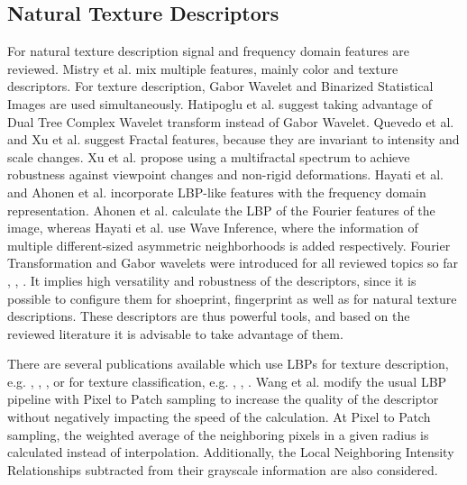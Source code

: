 \documentclass[draft,final]{vutinfth} %
\begin{document}
\subsection{Natural Texture Descriptors}
\par
For natural texture description signal and frequency domain features are reviewed.
Mistry et al. \cite{mistry2018content} mix multiple features, mainly color and texture descriptors.
For texture description, Gabor Wavelet and Binarized Statistical Images  \cite{kannala2012bsif} are used simultaneously.
Hatipoglu et al. \cite{hatipoglu2000image} suggest taking advantage of Dual Tree Complex Wavelet transform instead of Gabor Wavelet.
Quevedo et al. \cite{quevedo2002description} and Xu et al. \cite{xu2009viewpoint} suggest Fractal features, because they are invariant to intensity and scale changes.
Xu et al. \cite{xu2009viewpoint} propose using a multifractal spectrum to achieve robustness against viewpoint changes and non-rigid deformations.
Hayati et al. \cite{hayati2018wirif} and Ahonen et al. \cite{ahonen2009rotation} incorporate LBP-like features with the frequency domain representation.
Ahonen et al. \cite{ahonen2009rotation} calculate the LBP of the Fourier features of the image, whereas Hayati et al. \cite{hayati2018wirif} use Wave Inference, where the information of multiple different-sized asymmetric neighborhoods is added respectively.
Fourier Transformation and Gabor wavelets were introduced for all reviewed topics so far \cite{kortylewski2014unsupervised}, \cite{wu2019crime}, \cite{bolle2012fingerprint}.
It implies high versatility and robustness of the descriptors, since it is possible to configure them for shoeprint, fingerprint as well as for natural texture descriptions.  
These descriptors are thus powerful tools, and based on the reviewed literature it is advisable to take advantage of them.
\par
There are several publications available which use LBPs for texture description, e.g. \cite{guo2012discriminative}, \cite{hong2014combining}, \cite{ahonen2009rotation}, or for texture classification, e.g. \cite{khellah2011texture}, \cite{guo2010rotation}, \cite{zhang2017learning}.
Wang et al. \cite{wang2013pixel} modify the usual LBP pipeline with Pixel to Patch sampling to increase the quality of the descriptor without negatively impacting the speed of the calculation.
At Pixel to Patch sampling, the weighted average of the neighboring pixels in a given radius is calculated instead of interpolation.
Additionally, the Local Neighboring Intensity Relationships subtracted from their grayscale information are also considered.
\end{document}
